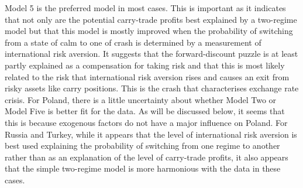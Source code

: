 \documentclass[12pt, a4paper, oneside]{article}\usepackage[]{graphicx}\usepackage[]{color}
\begin{document}
Model 5 is the preferred model in most cases.  This is important as it indicates that not only are the potential carry-trade profits best explained by a two-regime model but that this model is mostly improved when the probability of switching from a state of calm to one of crash is determined by a measurement of international risk aversion.  It suggests that the forward-discount puzzle is at least partly explained as a compensation for taking risk and that this is most likely related to the risk that international risk aversion rises and causes an exit from risky assets like carry positions.  This is the crash that characterises exchange rate crisis.  For Poland, there is a little uncertainty about whether Model Two or Model Five is better fit for the data.  As will be discussed below, it seems that this is because exogenous factors do not have a major influence on Poland. For Russia and Turkey, while it appears that the level of international risk aversion is best used explaining the probability of switching from one regime to another rather than as an explanation of the level of carry-trade profits, it also appears that the simple two-regime model is more harmonious with the data in these cases. 
\end{document}
